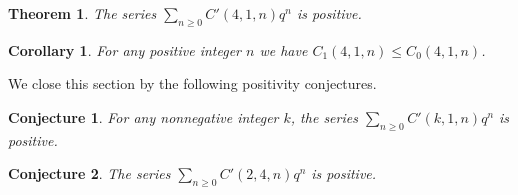 \documentclass[reqno]{amsart}
\theoremstyle{definition}
\theoremstyle{plain}
\newtheorem{theorem}    {Theorem}
\newtheorem{corollary}  {Corollary}
\newtheorem{conjecture} {Conjecture}
\theoremstyle{remark}
\numberwithin{equation}{section}
\begin{document}
\begin{theorem}\label{thm positiveC41}
The series $\textstyle \sum_{n\geq 0} C'(4,1,n)q^n$ is positive.
\end{theorem}
%
\begin{corollary}\label{cor ineqC41}
For any positive integer $n$ we have $C_1(4,1,n) \leq C_0(4,1,n)$.
\end{corollary}
%
We close this section by the following positivity conjectures.
\begin{conjecture}\label{conj positiveCk1}
For any nonnegative integer $k$, the series $\textstyle \sum_{n\geq 0} C'(k,1,n)q^n$ is positive.
\end{conjecture}
%
\begin{conjecture}\label{conj positiveC24}
The series $\textstyle \sum_{n\geq 0} C'(2,4,n)q^n$ is positive.
\end{conjecture}
%
\end{document}
